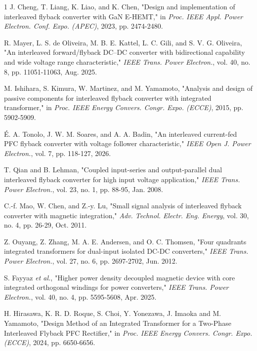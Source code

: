 \documentclass[lettersize,journal]{IEEEtran}
\begin{document}
\begin{thebibliography}{1}
J. Cheng, T. Liang, K. Liao, and K. Chen, "Design and implementation of interleaved flyback converter with GaN E-HEMT," in \textit{Proc. IEEE Appl. Power Electron. Conf. Expo. (APEC)}, 2023, pp. 2474-2480.

R. Mayer, L. S. de Oliveira, M. B. E. Kattel, L. C. Gili, and S. V. G. Oliveira, "An interleaved forward/flyback DC–DC converter with bidirectional capability and wide voltage range characteristic," \textit{IEEE Trans. Power Electron.}, vol. 40, no. 8, pp. 11051-11063, Aug. 2025.

M. Ishihara, S. Kimura, W. Martinez, and M. Yamamoto, "Analysis and design of passive components for interleaved flyback converter with integrated transformer," in \textit{Proc. IEEE Energy Convers. Congr. Expo. (ECCE)}, 2015, pp. 5902-5909.

É. A. Tonolo, J. W. M. Soares, and A. A. Badin, "An interleaved current-fed PFC flyback converter with voltage follower characteristic," \textit{IEEE Open J. Power Electron.}, vol. 7, pp. 118-127, 2026.

T. Qian and B. Lehman, "Coupled input-series and output-parallel dual interleaved flyback converter for high input voltage application," \textit{IEEE Trans. Power Electron.}, vol. 23, no. 1, pp. 88-95, Jan. 2008.

C.-f. Mao, W. Chen, and Z.-y. Lu, "Small signal analysis of interleaved flyback converter with magnetic integration," \textit{Adv. Technol. Electr. Eng. Energy}, vol. 30, no. 4, pp. 26-29, Oct. 2011.


Z. Ouyang, Z. Zhang, M. A. E. Andersen, and O. C. Thomsen, "Four quadrants integrated transformers for dual-input isolated DC-DC converters," \textit{IEEE Trans. Power Electron.}, vol. 27, no. 6, pp. 2697-2702, Jun. 2012.

S. Fayyaz \textit{et al.}, "Higher power density decoupled magnetic device with core integrated orthogonal windings for power converters," \textit{IEEE Trans. Power Electron.}, vol. 40, no. 4, pp. 5595-5608, Apr. 2025.


H. Hirasawa, K. R. D. Roque, S. Choi, Y. Yonezawa, J. Imaoka and M. Yamamoto, "Design Method of an Integrated Transformer for a Two-Phase Interleaved Flyback PFC Rectifier," in \textit{Proc. IEEE Energy Convers. Congr. Expo. (ECCE)}, 2024, pp. 6650-6656.


\end{thebibliography}
\end{document}

